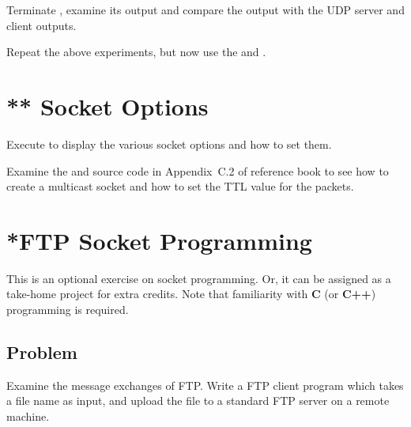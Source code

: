 \documentclass{../UTNetLab}
\begin{document}
Terminate , examine its output and compare the output with the UDP server and client outputs.

Repeat the above experiments, but now use the  and .

\section{** Socket Options}
Execute  to display the various socket options and how to set them.

Examine the  and  source code in Appendix~C.2 of reference book to see how to create a multicast socket and how to set the TTL value for the packets.


\section{*FTP Socket Programming}
This is an optional exercise on socket programming.
Or, it can be assigned as a take-home project for extra credits.
Note that familiarity with \textbf{C} (or \textbf{C++}) programming is required.

\subsection*{Problem}
Examine the message exchanges of FTP.
Write a FTP client program which takes a file name as input, and upload the file to a standard FTP server on a remote machine.
\end{document}
